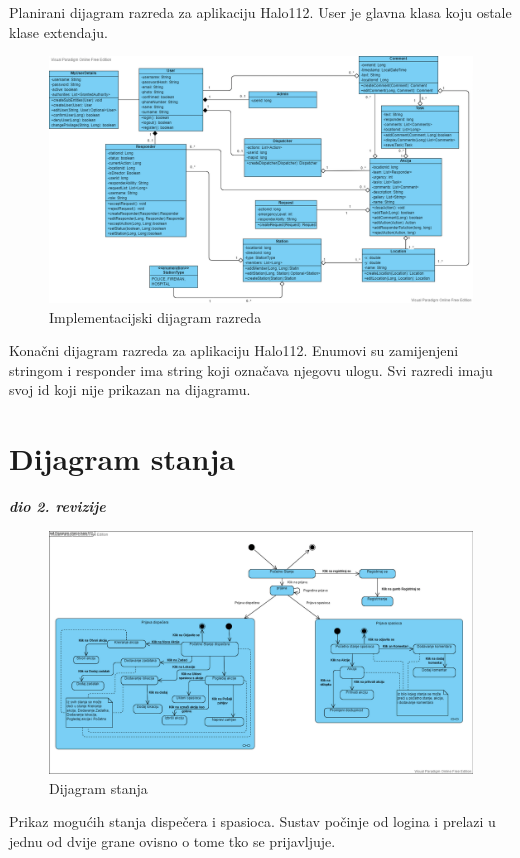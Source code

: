 			Planirani dijagram razreda za aplikaciju Halo112. User je glavna klasa koju ostale klase extendaju.
			
			 \begin{figure}[H]
				\includegraphics[scale=0.4]{slike/classes2.PNG}
				\centering
				\caption{Implementacijski dijagram razreda}
				\label{fig:razredi2}
			\end{figure}
			
			Konačni dijagram razreda za aplikaciju Halo112. Enumovi su zamijenjeni stringom i responder ima string koji označava njegovu ulogu. Svi razredi imaju svoj id koji nije prikazan na dijagramu. 
			\eject
		
		\section{Dijagram stanja}
			
			
			\textbf{\textit{dio 2. revizije}}\\
			
			\begin{figure}[H]
				\includegraphics[scale=0.32]{slike/stanja.PNG}
				\centering
				\caption{Dijagram stanja}
				\label{fig:dijagram_stanja}
			\end{figure}
			Prikaz mogućih stanja dispečera i spasioca. Sustav počinje od logina i prelazi u jednu od dvije grane ovisno o tome tko se prijavljuje.
			
